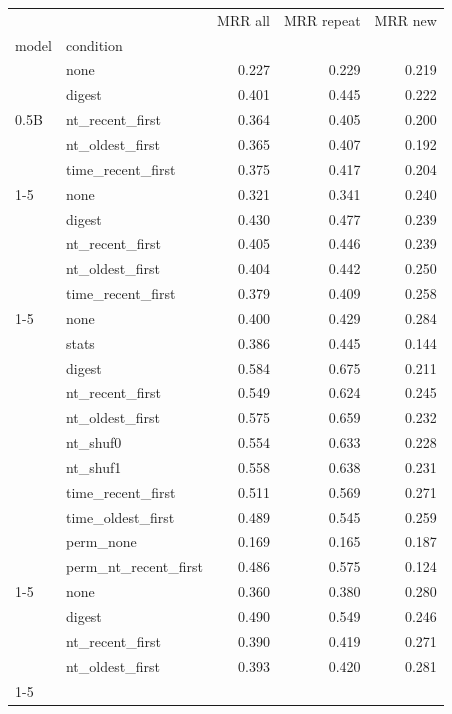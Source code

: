 \begin{tabular}{llrrr}
\toprule
 &  & MRR all & MRR repeat & MRR new \\
model & condition &  &  &  \\
\midrule
\multirow[t]{5}{*}{0.5B} & none & 0.227 & 0.229 & 0.219 \\
 & digest & 0.401 & 0.445 & 0.222 \\
 & nt\_recent\_first & 0.364 & 0.405 & 0.200 \\
 & nt\_oldest\_first & 0.365 & 0.407 & 0.192 \\
 & time\_recent\_first & 0.375 & 0.417 & 0.204 \\
\cline{1-5}
\multirow[t]{5}{*}{1.5B} & none & 0.321 & 0.341 & 0.240 \\
 & digest & 0.430 & 0.477 & 0.239 \\
 & nt\_recent\_first & 0.405 & 0.446 & 0.239 \\
 & nt\_oldest\_first & 0.404 & 0.442 & 0.250 \\
 & time\_recent\_first & 0.379 & 0.409 & 0.258 \\
\cline{1-5}
\multirow[t]{11}{*}{3B} & none & 0.400 & 0.429 & 0.284 \\
 & stats & 0.386 & 0.445 & 0.144 \\
 & digest & 0.584 & 0.675 & 0.211 \\
 & nt\_recent\_first & 0.549 & 0.624 & 0.245 \\
 & nt\_oldest\_first & 0.575 & 0.659 & 0.232 \\
 & nt\_shuf0 & 0.554 & 0.633 & 0.228 \\
 & nt\_shuf1 & 0.558 & 0.638 & 0.231 \\
 & time\_recent\_first & 0.511 & 0.569 & 0.271 \\
 & time\_oldest\_first & 0.489 & 0.545 & 0.259 \\
 & perm\_none & 0.169 & 0.165 & 0.187 \\
 & perm\_nt\_recent\_first & 0.486 & 0.575 & 0.124 \\
\cline{1-5}
\multirow[t]{4}{*}{Phi3.5} & none & 0.360 & 0.380 & 0.280 \\
 & digest & 0.490 & 0.549 & 0.246 \\
 & nt\_recent\_first & 0.390 & 0.419 & 0.271 \\
 & nt\_oldest\_first & 0.393 & 0.420 & 0.281 \\
\cline{1-5}
\bottomrule
\end{tabular}
